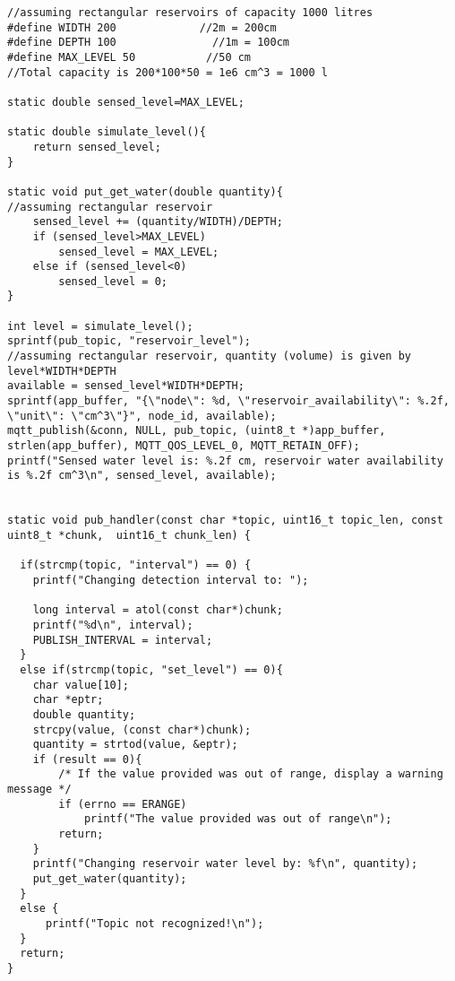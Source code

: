 \begin{lstlisting}
//assuming rectangular reservoirs of capacity 1000 litres
#define WIDTH 200             //2m = 200cm
#define DEPTH 100               //1m = 100cm
#define MAX_LEVEL 50           //50 cm
//Total capacity is 200*100*50 = 1e6 cm^3 = 1000 l

static double sensed_level=MAX_LEVEL;

static double simulate_level(){
    return sensed_level;
}

static void put_get_water(double quantity){
//assuming rectangular reservoir
    sensed_level += (quantity/WIDTH)/DEPTH;
    if (sensed_level>MAX_LEVEL)
        sensed_level = MAX_LEVEL;
    else if (sensed_level<0)
        sensed_level = 0;
}

int level = simulate_level();
sprintf(pub_topic, "reservoir_level");
//assuming rectangular reservoir, quantity (volume) is given by level*WIDTH*DEPTH
available = sensed_level*WIDTH*DEPTH;
sprintf(app_buffer, "{\"node\": %d, \"reservoir_availability\": %.2f, \"unit\": \"cm^3\"}", node_id, available);
mqtt_publish(&conn, NULL, pub_topic, (uint8_t *)app_buffer, strlen(app_buffer), MQTT_QOS_LEVEL_0, MQTT_RETAIN_OFF);
printf("Sensed water level is: %.2f cm, reservoir water availability is %.2f cm^3\n", sensed_level, available);


static void pub_handler(const char *topic, uint16_t topic_len, const uint8_t *chunk,  uint16_t chunk_len) {

  if(strcmp(topic, "interval") == 0) {
    printf("Changing detection interval to: ");

	long interval = atol(const char*)chunk;
    printf("%d\n", interval);
    PUBLISH_INTERVAL = interval;
  }
  else if(strcmp(topic, "set_level") == 0){
    char value[10];
    char *eptr;
    double quantity;
    strcpy(value, (const char*)chunk);
    quantity = strtod(value, &eptr);
    if (result == 0){
        /* If the value provided was out of range, display a warning message */
        if (errno == ERANGE)
            printf("The value provided was out of range\n");
        return;
    }
    printf("Changing reservoir water level by: %f\n", quantity);
    put_get_water(quantity);
  }
  else {
	  printf("Topic not recognized!\n");
  }
  return;
}


\end{lstlisting}



